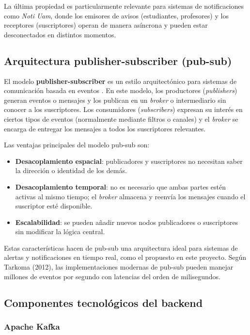 La última propiedad es particularmente relevante para sistemas de notificaciones como \textit{Noti Uam}, donde los emisores de avisos (estudiantes, profesores) y los receptores (suscriptores) operan de manera asíncrona y pueden estar desconectados en distintos momentos.

\subsection{Arquitectura publisher-subscriber (pub-sub)}

El modelo \textbf{publisher-subscriber} es un estilo arquitectónico para sistemas de comunicación basada en eventos \cite{tarkoma2012publish}. En este modelo, los productores (\textit{publishers}) generan eventos o mensajes y los publican en un \textit{broker} o intermediario sin conocer a los suscriptores. Los consumidores (\textit{subscribers}) expresan su interés en ciertos tipos de eventos (normalmente mediante filtros o canales) y el \textit{broker} se encarga de entregar los mensajes a todos los suscriptores relevantes.

Las ventajas principales del modelo pub-sub son:

\begin{itemize}
    \item \textbf{Desacoplamiento espacial}: publicadores y suscriptores no necesitan saber la dirección o identidad de los demás.
    \item \textbf{Desacoplamiento temporal}: no es necesario que ambas partes estén activas al mismo tiempo; el \textit{broker} almacena y reenvía los mensajes cuando el suscriptor esté disponible.
    \item \textbf{Escalabilidad}: se pueden añadir nuevos nodos publicadores o suscriptores sin modificar la lógica central.
\end{itemize}

Estas características hacen de pub-sub una arquitectura ideal para sistemas de alertas y notificaciones en tiempo real, como el propuesto en este proyecto. Según Tarkoma (2012), las implementaciones modernas de pub-sub pueden manejar millones de eventos por segundo con latencias del orden de milisegundos.

\subsection{Componentes tecnológicos del backend}

\subsubsection{Apache Kafka}

